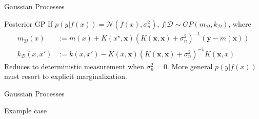 \documentclass[pdf]{beamer}
\begin{document}
\begin{frame}{Gaussian Processes}
\begin{block}{Posterior GP}
If $p(y|f(x)) = \mathcal{N}(f(x),\sigma_n^2)$, $f|\mathcal{D} \sim GP(m_\mathcal{D},k_\mathcal{D})$, where 
\begin{equation*}
\begin{split}
 m_\mathcal{D}(x) & := m(x) + K(x^\star,\mathbf{x}) (K(\mathbf{x},\mathbf{x})+\sigma^2_n)^{-1} (\mathbf{y} - m(\mathbf{x})) \\
 k_\mathcal{D}(x,x') & := k(x,x') - K(x,\mathbf{x})(K(\mathbf{x},\mathbf{x})+\sigma_n^2)^{-1}K(\mathbf{x},x)
\end{split}
\end{equation*}
Reduces to deterministic measurement when $\sigma_n^2 = 0$. More general $p(y|f(x))$ must resort to explicit marginalization.
\end{block}
\end{frame}

\begin{frame}{Gaussian Processes}
\begin{block}{Example case}


\begin{figure}
	\centering

\end{figure}

\end{block}
\end{frame}
\end{document}
